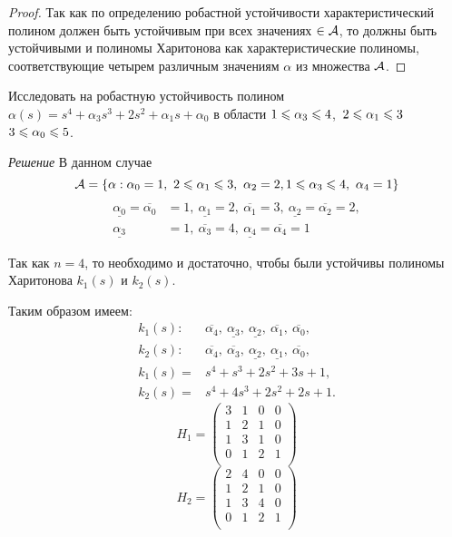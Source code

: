 \documentclass[../../TAU.tex]{subfiles}
\begin{document}
    \begin{proof}
        Так как по определению робастной устойчивости характеристический полином должен быть устойчивым при всех значениях $\in \mathcal{A}$, то должны быть устойчивыми и полиномы Харитонова как характеристические полиномы, соответствующие четырем различным значениям $\alpha$ из множества $\mathcal{A}$.
    \end{proof}

    \examp Исследовать на робастную устойчивость полином $\alpha(s) = s^4 + \alpha_3 s^3 + 2 s^2 + \alpha_1 s + \alpha_0$ в области $1\leqslant \alpha_3 \leqslant 4$,\ $ 2 \leqslant \alpha_1 \leqslant 3$ $3\leqslant \alpha_0\leqslant5$.

    {\it Решение}
    В данном случае 
    $$
        \IT{A} = \left\{\alpha: \alpha_0=1,\ 2\lse \alpha_1 \lse 3,\ \alpha_2 = 2, 1\lse \alpha_3\lse 4,\ \alpha_4=1\right\}
    $$
    \begin{align*}
        \underline{\alpha_0}=\overline{\alpha_0}&=1,\ 
        \underline{\alpha_1}=2,\ \overline{\alpha_1}=3,\
        \underline{\alpha_2}=\overline{\alpha_2}=2,\\
        \underline{\alpha_3}&=1,\ \overline{\alpha_3}=4,\ 
        \underline{\alpha_4}=\overline{\alpha_4}=1
    \end{align*}

    Так как $n=4$, то необходимо и достаточно, чтобы были устойчивы полиномы Харитонова 
    ${k}_1(s)$ и ${k}_2(s)$.

    Таким образом имеем:
    \begin{align*}
        {k}_1(s):\ &\overline{\alpha_4},\ \underline{\alpha_3},\ \underline{\alpha_2},\ \overline{\alpha_1},\ \overline{\alpha_0},\\
        {k}_2(s):\ &\overline{\alpha_4},\ \overline{\alpha_3},\ \underline{\alpha_2},\ \underline{\alpha_1},\ \overline{\alpha_0},\\
        {k}_1(s)= &s^4+s^3+2s^2+3s+1,\\
        {k}_2(s)= &s^4+4s^3+2s^2+2s+1.
    \end{align*}
    $$
        H_1=
        \begin{pmatrix}
            3 & 1 & 0 & 0 \\
            1 & 2 & 1 & 0 \\
            1 & 3 & 1 & 0 \\
            0 & 1 & 2 & 1 \\
        \end{pmatrix}
    $$
    $$
        H_2=
        \begin{pmatrix}
            2 & 4 & 0 & 0 \\
            1 & 2 & 1 & 0 \\
            1 & 3 & 4 & 0 \\
            0 & 1 & 2 & 1 \\
        \end{pmatrix}
    $$
\end{document}
